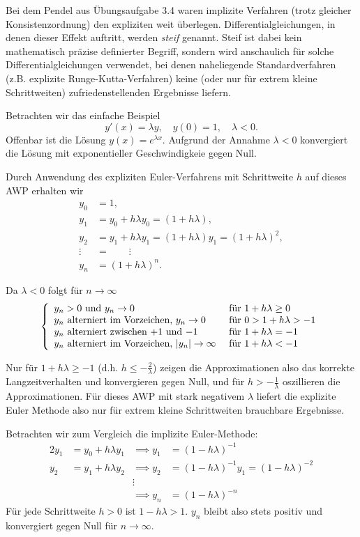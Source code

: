 \documentclass[
]{mycourse}
\theoremstyle{mythm}
\theoremstyle{break}
\begin{document}
Bei dem Pendel aus Übungsaufgabe 3.4 waren implizite Verfahren (trotz gleicher Konsistenzordnung) den expliziten weit überlegen. 
Differentialgleichungen, in denen dieser Effekt auftritt, werden \emph{steif} genannt. Steif ist dabei kein mathematisch präzise definierter Begriff, sondern wird anschaulich für solche Differentialgleichungen verwendet, bei denen naheliegende Standardverfahren (z.B. explizite Runge-Kutta-Verfahren) keine (oder nur für extrem kleine Schrittweiten) zufriedenstellenden Ergebnisse liefern. 

Betrachten wir das einfache Beispiel 
\[
y'(x)=\lambda y,\quad y(0)=1, \quad \lambda<0.
\]
Offenbar ist die Lösung $y(x)=e^{\lambda x}$. Aufgrund der Annahme $\lambda<0$ konvergiert die
Lösung mit exponentieller Geschwindigkeie gegen Null.

Durch Anwendung des expliziten Euler-Verfahrens mit Schrittweite $h$ auf dieses AWP erhalten wir
\begin{align*}
	y_0 &= 1,\\
y_1 &= y_0 + h \lambda y_0=(1+h\lambda),\\
y_2 &= y_1 + h \lambda y_1=(1+h\lambda)y_1=(1+h\lambda)^2,\\
\vdots \; &= \qquad \vdots\\
y_n&= (1+h\lambda)^n.
\end{align*}

Da $\lambda<0$ folgt für $n\to \infty$ 
\[
\left\{ \begin{array}{l l} \mbox{$y_n>0$ und $y_n\to 0$} & \mbox{ für $1+h\lambda \geq 0$}\\
\mbox{$y_n$ alterniert im Vorzeichen, $y_n\to 0$} & \mbox{ für $0>1+h\lambda>-1$}\\
\mbox{$y_n$ alterniert zwischen $+1$ und $-1$} & \mbox{ für $1+h\lambda=-1$}\\
\mbox{$y_n$ alterniert im Vorzeichen, $|y_n|\to \infty$} & \mbox{ für $1+h\lambda<-1$}
\end{array}\right.
\] 

Nur für $1+h\lambda \geq -1$ (d.h. $h\leq -\frac 2\lambda$) zeigen die Approximationen also das korrekte Langzeitverhalten und 
konvergieren gegen Null, und für $h> -\frac 1\lambda$ oszillieren die Approximationen.
Für dieses AWP mit stark negativem $\lambda$ liefert die explizite Euler Methode also nur
für extrem kleine Schrittweiten brauchbare Ergebnisse.

Betrachten wir zum Vergleich die implizite Euler-Methode:
\begin{alignat*}{2}
y_1 &= y_0 + h \lambda y_1 &\implies y_1&= (1-h\lambda)^{-1}\\
y_2 &= y_1 + h \lambda y_2 &\implies y_2&= (1-h\lambda)^{-1} y_1= (1-h\lambda)^{-2}\\ 
&&\vdots \qquad & \\
&&\implies y_n&=  (1-h\lambda)^{-n}
\end{alignat*}
Für jede Schrittweite $h>0$ ist $1-h\lambda>1$. $y_n$ bleibt also stets positiv und konvergiert gegen Null für $n\to \infty$.
\end{document}

